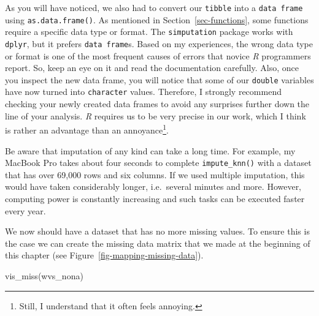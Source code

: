 \documentclass[
  letterpaper,
  DIV=11,
  numbers=noendperiod]{scrreprt}
\newenvironment{Shaded}{\begin{snugshade}}{\end{snugshade}}
\newcommand{\FunctionTok}[1]{\textcolor[rgb]{0.28,0.35,0.67}{#1}}
\newcommand{\NormalTok}[1]{\textcolor[rgb]{0.00,0.23,0.31}{#1}}
\begin{document}
As you will have noticed, we also had to convert our \texttt{tibble}
into a \texttt{data\ frame} using \texttt{as.data.frame()}. As mentioned
in Section~\ref{sec-functions}, some functions require a specific data
type or format. The \texttt{simputation} package works with
\texttt{dplyr}, but it prefers \texttt{data\ frame}s. Based on my
experiences, the wrong data type or format is one of the most frequent
causes of errors that novice \emph{R} programmers report. So, keep an
eye on it and read the documentation carefully. Also, once you inspect
the new data frame, you will notice that some of our \texttt{double}
variables have now turned into \texttt{character} values. Therefore, I
strongly recommend checking your newly created data frames to avoid any
surprises further down the line of your analysis. \emph{R} requires us
to be very precise in our work, which I think is rather an advantage
than an annoyance\footnote{Still, I understand that it often feels
  annoying.}.

Be aware that imputation of any kind can take a long time. For example,
my MacBook Pro takes about four seconds to complete
\texttt{impute\_knn()} with a dataset that has over 69,000 rows and six
columns. If we used multiple imputation, this would have taken
considerably longer, i.e.~several minutes and more. However, computing
power is constantly increasing and such tasks can be executed faster
every year.

We now should have a dataset that has no more missing values. To ensure
this is the case we can create the missing data matrix that we made at
the beginning of this chapter (see
Figure~\ref{fig-mapping-missing-data}).

\begin{Shaded}
\begin{Highlighting}[]
\FunctionTok{vis\_miss}\NormalTok{(wvs\_nona)}
\end{Highlighting}
\end{Shaded}
\end{document}
